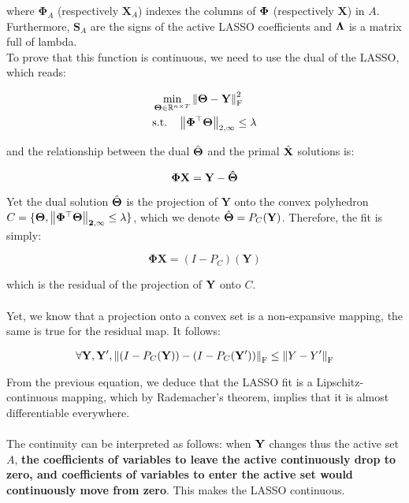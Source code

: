 \documentclass[a4paper,10pt]{article}
\theoremstyle{definition}
\begin{document}
where $\mathbf{\Phi}_A$ (respectively $\mathbf{X}_A$) indexes the columns of $\bf\Phi$ (respectively $\mathbf{X}$) in $A$. Furthermore, $\mathbf{S}_A$ are the signs of the active
LASSO coefficients and $\bf\Lambda$ is a matrix full of lambda.
\\
To prove that this function is continuous, we need to use the dual of the LASSO, which reads:

\begin{align*}
    &\min_{\mathbf{\Theta} \in \mathbb{R}^{n \times T}} \left \lVert  \mathbf{\Theta} - \mathbf{Y}  \right \rVert_{\text{F}}^2 \\
    &\text{s.t.} \quad \left \lVert \mathbf{\Phi^{\top}\Theta} \right \rVert_{2, \infty} \leq \lambda
\end{align*}

and the relationship between the dual $\hat{\bf{\Theta}}$ and the primal $\hat{\bf{X}}$ solutions is:

\begin{equation*}
    \bf{\Phi X} = \mathbf{Y - \hat{\Theta}}
\end{equation*}

Yet the dual solution $\hat{\bf{\Theta}}$ is the projection of $\mathbf{Y}$ onto the convex polyhedron $C = \{\bf{\Theta}, \left \lVert \mathbf{\Phi^{\top}\Theta} \right \rVert_{2, \infty} \leq \lambda\}$,
which we denote $\hat{\bf{\Theta}} = P_C(\bf{Y})$. Therefore, the  fit is simply:

\begin{equation*}
    \mathbf{\Phi X} = (I - P_C)(\mathbf{Y})
\end{equation*}

which is the residual of the projection of $\mathbf{Y}$ onto $C$.
\\
\\
Yet, we know that a projection onto a convex set is a non-expansive mapping, the same is true for the residual map. It follows:

\begin{equation*}
    \forall \mathbf{Y}, \mathbf{Y'}, \left \lVert (I - P_C(\mathbf{Y})) - (I - P_C(\mathbf{Y'})) \right \rVert_{\text{F}} \leq \left \lVert Y - Y' \right \rVert_{\text{F}}
\end{equation*}

From the previous equation, we deduce that the LASSO fit is a Lipschitz-continuous mapping, which by Rademacher's theorem, implies that it is almost differentiable everywhere.
\\
\\
The continuity can be interpreted as follows: when $\mathbf{Y}$ changes thus the active set $A$, \textbf{the coefficients of variables to leave
the active continuously drop to zero, and coefficients of variables to enter the active set would continuously move from zero}. This makes the LASSO continuous.
\end{document}
